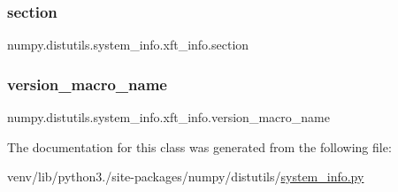 \subsubsection{\texorpdfstring{section}{section}}
{\footnotesize\ttfamily numpy.\+distutils.\+system\+\_\+info.\+xft\+\_\+info.\+section\hspace{0.3cm}{\ttfamily [static]}}

\mbox{\label{classnumpy_1_1distutils_1_1system__info_1_1xft__info_a9667994b53ce9da1e541ed6c9af90d2b}} 
\subsubsection{\texorpdfstring{version\+\_\+macro\+\_\+name}{version\_macro\_name}}
{\footnotesize\ttfamily numpy.\+distutils.\+system\+\_\+info.\+xft\+\_\+info.\+version\+\_\+macro\+\_\+name\hspace{0.3cm}{\ttfamily [static]}}



The documentation for this class was generated from the following file\+:\begin{DoxyCompactItemize}
\item 
venv/lib/python3./site-\/packages/numpy/distutils/\hyperlink{system__info_8py}{system\+\_\+info.\+py}\end{DoxyCompactItemize}

